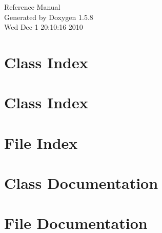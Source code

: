 \documentclass[a4paper]{book}
\begin{document}
\begin{titlepage}
\vspace*{7cm}
\begin{center}
{\Large Reference Manual}\\
\vspace*{1cm}
{\large Generated by Doxygen 1.5.8}\\
\vspace*{0.5cm}
{\small Wed Dec 1 20:10:16 2010}\\
\end{center}
\end{titlepage}
\clearemptydoublepage
{}
\tableofcontents
\clearemptydoublepage
{}
\chapter{Class Index}

\chapter{Class Index}

\chapter{File Index}

\chapter{Class Documentation}
































\chapter{File Documentation}





























\printindex
\end{document}

